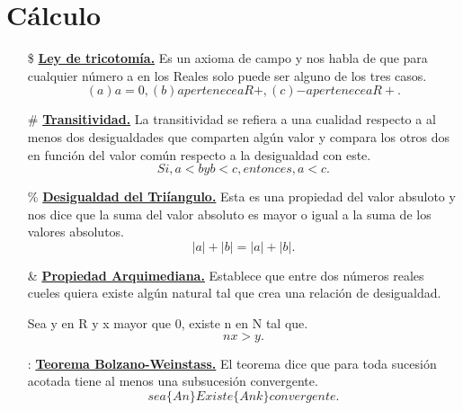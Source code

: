 \documentclass[12pt,letterpaper]{article}
\begin{document}
    \section*{Cálculo}
    \begin{itemize}
        \item[\$] \textbf{\underline{{Ley de tricotomía.}}}\newline
        Es un axioma de campo y nos habla de que para cualquier número a en los Reales solo puede ser alguno de los tres casos.
        $$(a) {a} = 0,
          (b) {a} pertenece a R+,
          (c) {-a} pertenece a R+.$$
        \item[\#] \textbf{\underline{{Transitividad.}}}\newline
        La transitividad se refiera a una cualidad respecto a al menos dos desigualdades que comparten algún valor y compara los otros dos en función del valor común respecto a la desigualdad con este.
        $$Si, a < b y b < c, entonces, a < c.$$
        \item[\%] \textbf{\underline{{Desigualdad del Triíangulo.}}}\newline
        Esta es una propiedad del valor absuloto y nos dice que la suma del valor absoluto es mayor o igual a la suma de los valores absolutos.
        $$|a| + |b| = |a| + |b|.$$
        \item[\&] \textbf{\underline{Propiedad Arquimediana.}}\newline
        Establece que entre dos números reales cueles quiera existe algún natural tal que crea una relación de desigualdad.
       \begin{center}
        Sea y en R y x mayor que 0, existe n en N tal que.
        $$nx > y.$$
       \end{center} 
        \item[:] \textbf{\underline{{Teorema Bolzano-Weinstass.}}}\newline
        El teorema dice que para toda sucesión acotada tiene al menos una subsucesión convergente.
        $$sea\{An\} Existe \{Ank\} convergente.$$
    \end{itemize}
    \newpage
\end{document}
